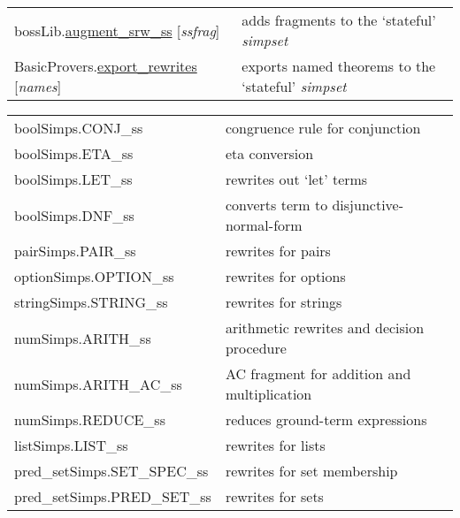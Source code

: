\documentclass[landscape,10pt]{article}
\newcommand{\hol}[2]{{\sffamily #1.\href{#1.#2.html}{#2}}}
\newcommand{\holnoref}[2]{{\sffamily #1.#2}}
\newcommand{\var}[1]{{\emph{#1}}}
\begin{document}
\begin{multicols}{2}
\medskip
\noindent\begin{tabular}{ll}
\hol{bossLib}{augment_srw_ss} [\var{ssfrag}] & adds fragments to the `stateful' \emph{simpset} \\
\hol{BasicProvers}{export_rewrites} [\var{names}] & exports named theorems to the `stateful' \emph{simpset} \\
\end{tabular}


\noindent\begin{tabular}{ll}
\holnoref{boolSimps}{CONJ_ss} & congruence rule for conjunction \\
\holnoref{boolSimps}{ETA_ss} & eta conversion \\
\holnoref{boolSimps}{LET_ss} & rewrites out `let' terms \\
\holnoref{boolSimps}{DNF_ss} & converts term to disjunctive-normal-form\\
\holnoref{pairSimps}{PAIR_ss} & rewrites for pairs \\
\holnoref{optionSimps}{OPTION_ss} & rewrites for options \\
\holnoref{stringSimps}{STRING_ss} & rewrites for strings \\
\holnoref{numSimps}{ARITH_ss} & arithmetic rewrites and decision procedure \\
\holnoref{numSimps}{ARITH_AC_ss} & AC fragment for addition and multiplication \\
\holnoref{numSimps}{REDUCE_ss} & reduces ground-term expressions \\
\holnoref{listSimps}{LIST_ss} & rewrites for lists \\
\holnoref{pred_setSimps}{SET_SPEC_ss} & rewrites for set membership \\
\holnoref{pred_setSimps}{PRED_SET_ss} & rewrites for sets \\
\end{tabular}

\end{multicols}
\end{document}

